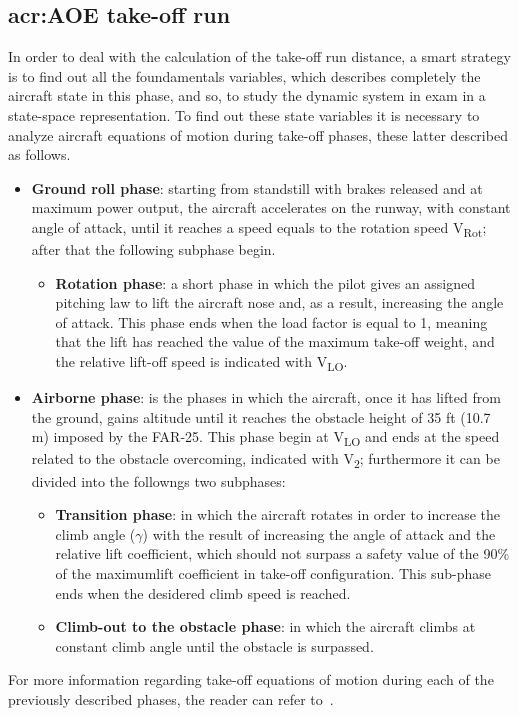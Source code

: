 \subsection{\gls{acr:AOE} take-off run}
In order to deal with the calculation of the take-off run distance, a smart strategy is to find out all the foundamentals variables, which describes completely the aircraft state in this phase, and so, to study the dynamic system in exam in a state-space representation.
%
\noindent
To find out these state variables it is necessary to analyze aircraft equations of motion during take-off phases, these latter described as follows.
\begin{itemize}
\item \textbf{Ground roll phase}: starting from standstill with brakes released and at maximum power output, the aircraft accelerates on the runway, with constant angle of attack, until it reaches a speed equals to the rotation speed V\textsubscript{Rot}; after that the following subphase begin.
%
\begin{itemize}
\item \textbf{Rotation phase}: a short phase in which the pilot gives an assigned pitching law to lift the aircraft nose and, as a result, increasing the angle of attack. This phase ends when the load factor is equal to 1, meaning that the lift has reached the value of the maximum take-off weight, and the relative lift-off speed is indicated with V\textsubscript{LO}. 
%
\end{itemize}
%
\item \textbf{Airborne phase}: is the phases in which the aircraft, once it has lifted from the ground, gains altitude until it reaches the obstacle height of 35 \si{ft} (10.7 \si{\meter}) imposed by the \gls{FAR}-25. This phase begin at V\textsubscript{LO} and ends at the speed related to the obstacle overcoming, indicated with V\textsubscript{2}; furthermore it can be divided into the followngs two subphases:
%
\begin{itemize}
\item \textbf{Transition phase}: in which the aircraft rotates in order to increase the climb angle ($\gamma$) with the result of increasing the angle of attack and the relative lift coefficient, which should not surpass a safety value of the 90\% of the maximumlift coefficient in take-off configuration. This sub-phase ends when the desidered climb speed is reached.
%
\item \textbf{Climb-out to the obstacle phase}: in which the aircraft climbs at constant climb angle until the obstacle is surpassed.
\end{itemize}
\end{itemize}
%
\noindent
For more information regarding take-off equations of motion during each of the previously described phases, the reader can refer to~\cite{McCormick}.

